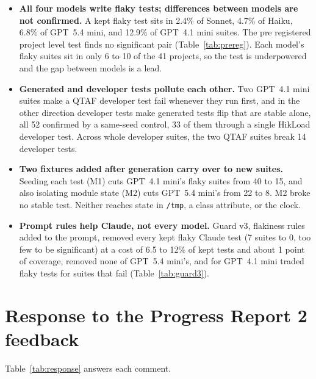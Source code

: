\documentclass[sigconf,nonacm]{acmart}
\begin{document}
\begin{itemize}
\item \textbf{All four models write flaky tests; differences between models are not confirmed.} A kept flaky test sits in 2.4\% of Sonnet, 4.7\% of Haiku, 6.8\% of GPT~5.4 mini, and 12.9\% of GPT~4.1 mini suites. The pre registered project level test finds no significant pair (Table~\ref{tab:prereg}). Each model's flaky suites sit in only 6 to 10 of the 41 projects, so the test is underpowered and the gap between models is a lead.
\item \textbf{Generated and developer tests pollute each other.} Two GPT~4.1 mini suites make a QTAF developer test fail whenever they run first, and in the other direction developer tests make generated tests flip that are stable alone, all 52 confirmed by a same-seed control, 33 of them through a single HikLoad developer test. Across whole developer suites, the two QTAF suites break 14 developer tests.
\item \textbf{Two fixtures added after generation carry over to new suites.} Seeding each test (M1) cuts GPT~4.1 mini's flaky suites from 40 to 15, and also isolating module state (M2) cuts GPT~5.4 mini's from 22 to 8. M2 broke no stable test. Neither reaches state in \texttt{/tmp}, a class attribute, or the clock.
\item \textbf{Prompt rules help Claude, not every model.} Guard v3, flakiness rules added to the prompt, removed every kept flaky Claude test (7 suites to 0, too few to be significant) at a cost of 6.5 to 12\% of kept tests and about 1 point of coverage, removed none of GPT~5.4 mini's, and for GPT~4.1 mini traded flaky tests for suites that fail (Table~\ref{tab:guard3}).
\end{itemize}

\section{Response to the Progress Report 2 feedback}
Table~\ref{tab:response} answers each comment.
\end{document}
